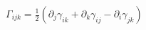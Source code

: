 $\Gamma_{ijk} = \frac{1}{2} \left( \partial_j \gamma_{ik} + \partial_k \gamma_{ij} - \partial_i \gamma_{jk} \right)$
